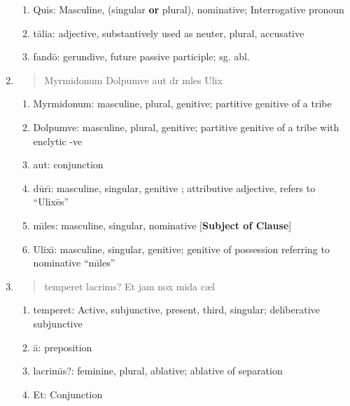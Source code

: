\documentclass[]{article}
\newcommand{\latify}[1]{
        \Large
        \begin{verse}
          \begin{metrica}
          {#1}\\
          \end{metrica}
        \end{verse}
        \normalsize
}
\begin{document}
\begin{enumerate}
\begin{enumerate}
	\item Quis:   Masculine, (singular \textbf{or} plural), nominative; Interrogative pronoun

	\item t\={a}lia:  adjective, substantively used as neuter, plural, accusative

	\item fand\={o}: gerundive, future passive participle; sg. abl.
\end{enumerate}

\item \latify{Myrmidonum Dolpumve aut d{}r{\macron {\i}} m{\macron {\i}}les Ulix{\macron {\i}}}
\begin{enumerate}

	\item Myrmidonum:  masculine, plural, genitive; partitive genitive of a tribe

	\item Dolpumve:  masculine, plural, genitive; partitive genitive of a tribe with enclytic -ve

	\item aut:  conjunction

	\item d\={u}r\={\i}:  masculine, singular, genitive ; attributive adjective, refers to ``Ulix\={e}s''

	\item m\={\i}les: masculine, singular, nominative [\textbf{Subject of Clause}]

	\item Ulix\={\i}: masculine, singular, genitive; genitive of possession referring to nominative ``m\={\i}les''

\end{enumerate}


\item \latify{temperet {} lacrim{\macron {\i}}s?  Et jam nox {\macron {u}}mida c{\ae}l{\macron {o}}}
\begin{enumerate}

	\item temperet:   Active, subjunctive, present, third, singular; deliberative subjunctive

	\item \={a}:  preposition

	\item lacrim\={\i}s?:  feminine, plural, ablative; ablative of separation

	\item Et:  Conjunction


\end{enumerate}
\end{enumerate}
\end{document}
